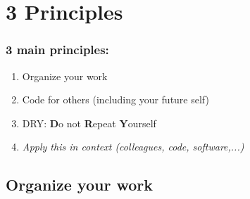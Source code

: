 \documentclass[xcolor=x11names,compress]{beamer}
\renewcommand{\(}{\begin{columns}}
\renewcommand{\)}{\end{columns}}
\newcommand{\<}[1]{\begin{column}{#1}}
\renewcommand{\>}{\end{column}}
\begin{document}

\section{3 Principles}

\begin{frame}[<+->]
   \frametitle{3 main principles:}
    \begin{enumerate}
     \item Organize your work
     \item Code for others (including your future self)
     \item DRY: \textbf{D}o \textcolor{brique}{ not} \textbf{R}epeat \textbf{Y}ourself
      \item[]   \begin{alertblock}{}
            \begin{center}
                  \textit{Apply this in context (colleagues, code, software,...)}
            \end{center}
      \end{alertblock}
    \end{enumerate}
\end{frame}

\subsection{Organize your work }
\end{document}
